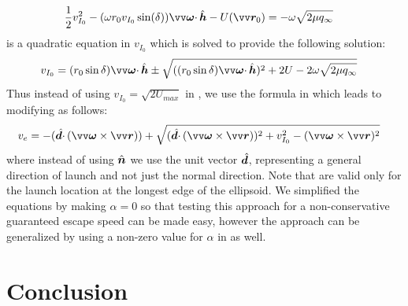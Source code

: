 \begin{align}
    \frac{1}{2} v_{I_0}^2 - (\omega r_0 v_{I_0} \sin(\delta)) \bv{\omega}\cdotp\buv{h} - U(\bv{r}_0) &= -\omega \sqrt{2\mu q_{\infty}}
    \label{eqn:jacobian_equate_equatorial_mod}
\end{align}
 is a quadratic equation in $v_{I_0}$ which is solved to provide the following solution:
\begin{align}
    v_{I_0} &= (r_0 \sin\delta) \bv{\omega}\cdotp\buv{h} \pm \sqrt{((r_0 \sin\delta)\bv{\omega}\cdotp\buv{h})^2 + 2U - 2\omega\sqrt{2\mu q_\infty}}
    \label{eqn:non_conservative_inertial_guaranteed_escape_speed}
\end{align}
Thus instead of using $v_{I_0} = \sqrt{2U_{max}}$ in , we use the formula in  which leads to modifying  as follows:
\begin{align}
    v_e &= -(\buv{d} \cdotp (\bv{\omega} \times \bv{r})) + \sqrt{(\buv{d} \cdotp (\bv{\omega} \times \bv{r}))^2 + v_{I_0}^2 - (\bv{\omega} \times {\bv{r}})^2}
    \label{eqn:nonconservative_escape_speed}
\end{align}
where instead of using $\hat{\bm{n}}$ we use the unit vector $\hat{\bm{d}}$, representing a general direction of launch and not just the normal direction. Note that  are valid only for the launch location at the longest edge of the ellipsoid. We simplified the equations by making $\alpha=0$ so that testing this approach for a non-conservative guaranteed escape speed can be made easy, however the approach can be generalized by using a non-zero value for $\alpha$ in  as well.

\section{Conclusion}
\label{sec:dynamics_conclusion}
